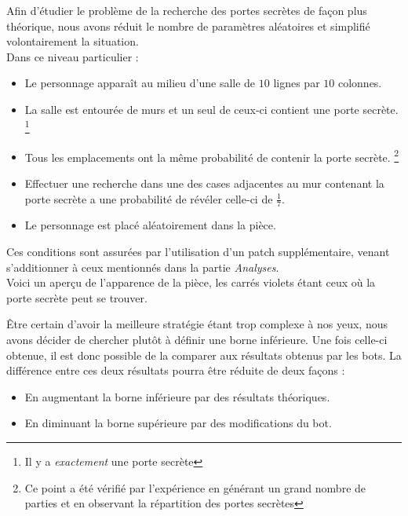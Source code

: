 \documentclass[a4paper,12pt]{article}
\begin{document}
Afin d'étudier le problème de la recherche des portes secrètes de façon plus
théorique, nous avons réduit le nombre de paramètres aléatoires et simplifié
volontairement la situation.
\\
Dans ce niveau particulier :
\begin{itemize}
\item Le personnage apparaît au milieu d'une salle de $10$ lignes par $10$
  colonnes.
\item La salle est entourée de murs et un seul de ceux-ci contient une porte
  secrète.
  \footnote{Il y a {\em exactement} une porte secrète}
\item Tous les emplacements ont la même probabilité de contenir la porte
  secrète.
  \footnote{Ce point a été vérifié par l'expérience en générant un grand nombre
    de parties et en observant la répartition des portes secrètes}
\item Effectuer une recherche dans une des cases adjacentes au mur contenant la
  porte secrète a une probabilité de révéler celle-ci de $\frac{1}{7}$.
\item Le personnage est placé aléatoirement dans la pièce.
\end{itemize}

Ces conditions sont assurées par l'utilisation d'un patch supplémentaire, venant
s'additionner à ceux mentionnés dans la partie {\em Analyses}.
\\
Voici un aperçu de l'apparence de la pièce, les carrés violets étant ceux où la
porte secrète peut se trouver.

\begin{center}
\end{center}

Être certain d'avoir la meilleure stratégie étant trop complexe à nos yeux, nous
avons décider de chercher plutôt à définir une borne inférieure. Une fois
celle-ci obtenue, il est donc possible de la comparer aux résultats obtenus par
les bots. La différence entre ces deux résultats pourra être réduite de deux
façons :
\begin{itemize}
\item En augmentant la borne inférieure par des résultats théoriques.
\item En diminuant la borne supérieure par des modifications du bot.
\end{itemize}
\end{document}

